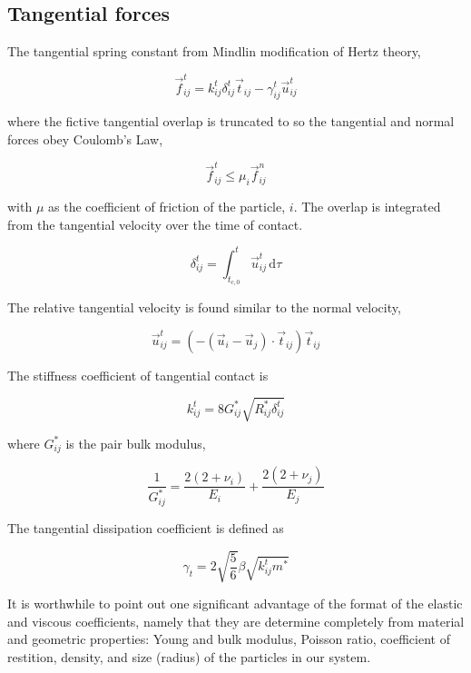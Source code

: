 \subsection{Tangential forces}
The tangential spring constant from Mindlin modification of Hertz theory, 

\begin{equation}\label{eq:tangential-force}
	\vec{f}^t_{ij} = k^t_{ij} \delta^t_{ij}\vec{t}_{ij} - \gamma^t_{ij} \vec{u}^t_{ij}
\end{equation}

where the fictive tangential overlap is truncated to so the tangential and normal forces obey Coulomb's Law,

\begin{equation}
	\vec{f}^t_{ij} \le \mu_i \vec{f}^n_{ij}
\end{equation}

with $\mu$ as the coefficient of friction of the particle, $i$.  The overlap is integrated from the tangential velocity over the time of contact.

\begin{equation}
	\delta^t_{ij} = \int_{t_{c,0}}^{t} \vec{u}^t_{ij}\,\mathrm{d}\tau
\end{equation}

The relative tangential velocity is found similar to the normal velocity,

\begin{equation}
	\vec{u}^t_{ij} = (-(\vec{u}_i-\vec{u}_j)\cdot\vec{t}_{ij})\vec{t}_{ij}
\end{equation}

The stiffness coefficient of tangential contact is

\begin{equation}
	k^t_{ij} = 8 G_{ij}^*\sqrt{R_{ij}^*\delta^t_{ij}}
\end{equation}

where $G_{ij}^*$ is the pair bulk modulus,

\begin{equation}
	\frac{1}{G^*_{ij}} = \frac{2(2+\nu_i)}{E_i} + \frac{2(2+\nu_j)}{E_j}
\end{equation}

The tangential dissipation coefficient is defined as

\begin{equation}
	\gamma_t = 2\sqrt{\frac{5}{6}}\beta\sqrt{k^t_{ij} m^*}
\end{equation}


It is worthwhile to point out one significant advantage of the format of the elastic and viscous coefficients, namely that they are determine completely from material and geometric properties: Young and bulk modulus, Poisson ratio, coefficient of restition, density, and size (radius) of the particles in our system.




